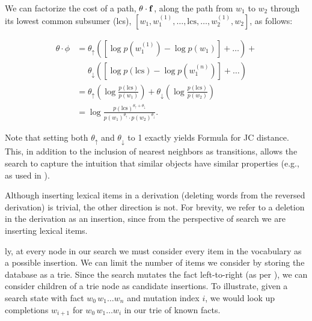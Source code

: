 We can factorize the cost of a path, $\theta \cdot \mathbf{f}$, along the path
  from $w_1$ to $w_2$ through its lowest common subsumer (lcs),
  $[w_1, w_1^{(1)}, \dots, \textrm{lcs}, \dots,  w_2^{(1)}, w_2]$,
  as follows:

\begin{align*}
\theta \cdot \phi
  &= \theta_\uparrow \left( 
    \left[\log p(w_1^{(1)}) - \log p(w_1)\right] +
    \dots
    \right) + \\
  &~~~~~~ \theta_\downarrow \left( 
    \left[\log p(\textrm{lcs}) - \log p(w_1^{(n)}) \right] +
    \dots
    \right) \\
  &= \theta_\uparrow \left( \log \frac{p(\textrm{lcs})}{p(w_1)} \right) +
     \theta_\downarrow \left( \log \frac{p(\textrm{lcs})}{p(w_2)} \right) \\
  &= \log \frac{ p(\textrm{lcs})^{\theta_\uparrow + \theta_\downarrow} }
               { p(w_1)^{\theta_\uparrow} \cdot p(w_2)^{\theta_\downarrow} }.
\end{align*}

Note that setting both $\theta_\uparrow$ and $\theta_\downarrow$ to 1 exactly
  yields Formula  for JC distance.
This, in addition to the inclusion of nearest neighbors as transitions,
  allows the search to capture the intuition that similar objects
  have similar properties
  (e.g., as used in ).
%


%
%
Although inserting lexical items in a derivation (deleting words from
  the reversed derivation) is trivial, the other direction is not.
For brevity, we refer to a deletion in the derivation as an insertion,
  since from the perspective of search we are inserting lexical items.

\Naive ly, at every node in our search we must consider every item in
  the vocabulary as a possible insertion.
We can limit the number of items we consider by storing the database
  as a trie.
Since the search mutates the fact left-to-right 
  (as per ), we can
  consider children of a trie node as candidate insertions.
To illustrate, given a search state with fact $w_0\,w_1 \dots w_n$
  and mutation index $i$, we would look up completions $w_{i+1}$ for
  $w_0\,w_1 \dots w_i$ in our trie of known facts.


